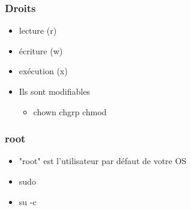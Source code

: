 \begin{frame}
    \frametitle{Droits}
    \begin{itemize}
        \item lecture (r)
        \item écriture (w)
        \item exécution (x)
	\item Ils sont modifiables
	\begin{itemize}
	    \item chown chgrp chmod
	\end{itemize}
    \end{itemize}
\end{frame}


\begin{frame}
    \frametitle{root}
    \begin{itemize}
	\item "root" est l'utilisateur par défaut de votre OS
	\item sudo
	\item su -c
    \end{itemize}
\end{frame}
